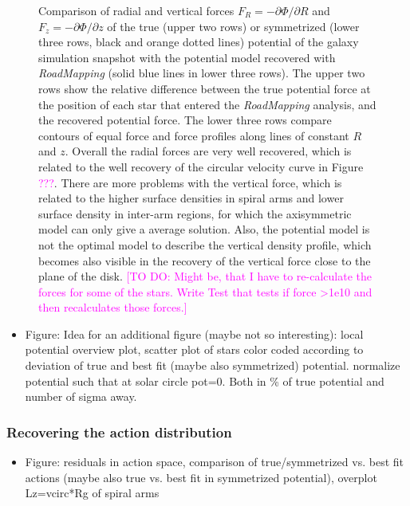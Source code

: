 \documentclass[iop,revtex4,numberedappendix,appendixfloats]{emulateapj}
\newcommand{\RM}{{\sl RoadMapping}}
\newcommand{\Wilma}[1]{\textcolor{Magenta}{#1}}
\begin{document}
\begin{figure}[!htbp]
\caption{Comparison of radial and vertical forces  $F_R=-\partial \Phi / \partial R$ and $F_z = -\partial \Phi / \partial z$ of the true (upper two rows) or symmetrized (lower three rows, black and orange dotted lines) potential of the galaxy simulation snapshot with the potential model recovered with \RM{} (solid blue lines in lower three rows). The upper two rows show the relative difference between the true potential force at the position of each star that entered the \RM{} analysis, and the recovered potential force. The lower three rows compare contours of equal force and force profiles along lines of constant $R$ and $z$. Overall the radial forces are very well recovered, which is related to the well recovery of the circular velocity curve in Figure \Wilma{???}. There are more problems with the vertical force, which is related to the higher surface densities in spiral arms and lower surface density in inter-arm regions, for which the axisymmetric model can only give a average solution. Also, the potential model is not the optimal model to describe the vertical density profile, which becomes also visible in the recovery of the vertical force close to the plane of the disk. \Wilma{[TO DO: Might be, that I have to re-calculate the forces for some of the stars. Write Test that tests if force >1e10 and then recalculates those forces.]}}
\label{fig:???}
\end{figure}


\begin{itemize}
\item Figure: Idea for an additional figure (maybe not so interesting): local potential overview plot, scatter plot of stars color coded according to deviation of true and best fit (maybe also symmetrized) potential. normalize potential such that at solar circle pot=0. Both in \% of true potential and number of sigma away.
\end{itemize}

\subsubsection{Recovering the action distribution}

\begin{itemize}
\item Figure: residuals in action space, comparison of true/symmetrized vs. best fit actions (maybe also true vs. best fit in symmetrized potential), overplot Lz=vcirc*Rg of spiral arms
\end{itemize}
\end{document}
